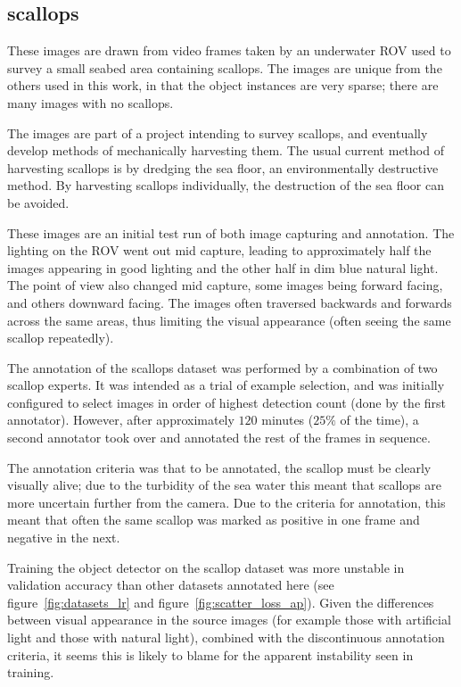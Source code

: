 \subsection{scallops}
    
These images are drawn from video frames taken by an underwater \gls{ROV} used to survey a small seabed area containing scallops. The images are unique from the others used in this work, in that the object instances are very sparse; there are many images with no scallops. 

The images are part of a project intending to survey scallops, and eventually develop methods of mechanically harvesting them. The usual current method of harvesting scallops is by dredging the sea floor, an environmentally destructive method. By harvesting scallops individually, the destruction of the sea floor can be avoided.

These images are an initial test run of both image capturing and annotation. The lighting on the \gls{ROV} went out mid capture, leading to approximately half the images appearing in good lighting and the other half in dim blue natural light. The point of view also changed mid capture, some images being forward facing, and others downward facing. The images often traversed backwards and forwards across the same areas, thus limiting the visual appearance (often seeing the same scallop repeatedly). 

The annotation of the scallops dataset was performed by a combination of two scallop experts. It was intended as a trial of example selection, and was initially configured to select images in order of highest detection count (done by the first annotator). However, after approximately $120$ minutes ($25\%$ of the time), a second annotator took over and annotated the rest of the frames in sequence. 

The annotation criteria was that to be annotated, the scallop must be clearly visually alive; due to the turbidity of the sea water this meant that scallops are more uncertain further from the camera. Due to the criteria for annotation, this meant that often the same scallop was marked as positive in one frame and negative in the next. 

Training the object detector on the scallop dataset was more unstable in validation accuracy than other datasets annotated here (see figure~\ref{fig:datasets_lr} and figure~\ref{fig:scatter_loss_ap}). Given the differences between visual appearance in the source images (for example those with artificial light and those with natural light), combined with the discontinuous annotation criteria, it seems this is likely to blame for the apparent instability seen in training. 

